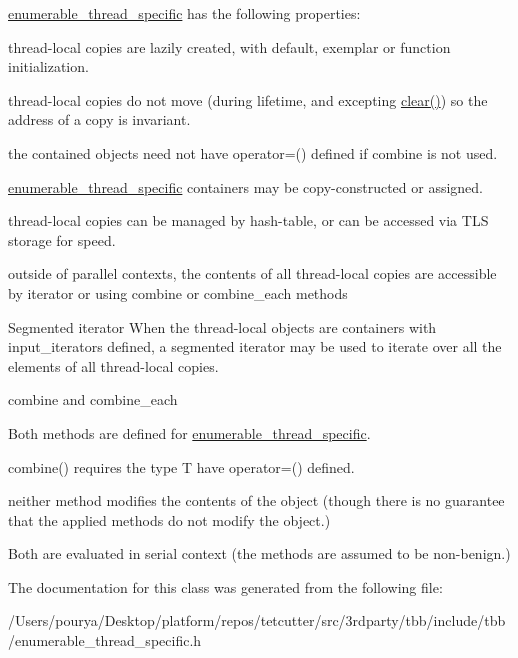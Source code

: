 \hyperlink{classtbb_1_1interface6_1_1enumerable__thread__specific}{enumerable\+\_\+thread\+\_\+specific} has the following properties\+:
\begin{DoxyItemize}
\item thread-\/local copies are lazily created, with default, exemplar or function initialization.
\item thread-\/local copies do not move (during lifetime, and excepting \hyperlink{classtbb_1_1interface6_1_1enumerable__thread__specific_a85a0d8f088ef1ee07aeb2c0e944a4a5e}{clear()}) so the address of a copy is invariant.
\item the contained objects need not have operator=() defined if combine is not used.
\item \hyperlink{classtbb_1_1interface6_1_1enumerable__thread__specific}{enumerable\+\_\+thread\+\_\+specific} containers may be copy-\/constructed or assigned.
\item thread-\/local copies can be managed by hash-\/table, or can be accessed via T\+L\+S storage for speed.
\item outside of parallel contexts, the contents of all thread-\/local copies are accessible by iterator or using combine or combine\+\_\+each methods
\end{DoxyItemize}

\begin{DoxyParagraph}{Segmented iterator}
When the thread-\/local objects are containers with input\+\_\+iterators defined, a segmented iterator may be used to iterate over all the elements of all thread-\/local copies.
\end{DoxyParagraph}
\begin{DoxyParagraph}{combine and combine\+\_\+each}

\begin{DoxyItemize}
\item Both methods are defined for \hyperlink{classtbb_1_1interface6_1_1enumerable__thread__specific}{enumerable\+\_\+thread\+\_\+specific}.
\item combine() requires the type T have operator=() defined.
\item neither method modifies the contents of the object (though there is no guarantee that the applied methods do not modify the object.)
\item Both are evaluated in serial context (the methods are assumed to be non-\/benign.) 
\end{DoxyItemize}
\end{DoxyParagraph}


The documentation for this class was generated from the following file\+:\begin{DoxyCompactItemize}
\item 
/\+Users/pourya/\+Desktop/platform/repos/tetcutter/src/3rdparty/tbb/include/tbb/enumerable\+\_\+thread\+\_\+specific.\+h\end{DoxyCompactItemize}
